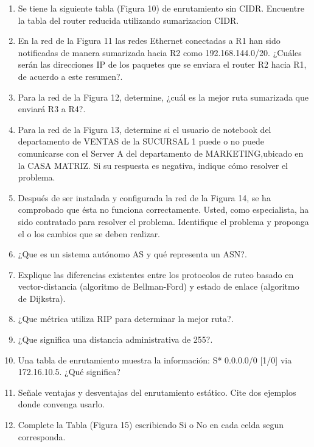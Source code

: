 \documentclass{udparticle}
\begin{document}
\begin{enumerate}
\item Se tiene la siguiente tabla (Figura 10) de enrutamiento sin CIDR. Encuentre 
la tabla del router reducida utilizando sumarizacion CIDR.
\item En la red de la Figura 11 las redes Ethernet conectadas a R1 han sido 
notificadas de manera sumarizada hacia R2 como 192.168.144.0/20. ¿Cuáles serán 
las direcciones IP de los paquetes que se enviara el router R2 hacia R1, de acuerdo a este resumen?.
\item Para la red de la Figura 12, determine, ¿cuál es la mejor ruta sumarizada que
enviará R3 a R4?. 

\item Para la red de la Figura 13, determine si el usuario de notebook del 
departamento de VENTAS de la SUCURSAL 1 puede o no puede comunicarse con el Server 
A del departamento de MARKETING,ubicado en la CASA MATRIZ. Si su respuesta es 
negativa, indique cómo resolver el problema.

\item Después de ser instalada y configurada la red de la Figura 14, se ha 
comprobado que ésta no funciona correctamente. Usted, como especialista, ha sido 
contratado para resolver el problema. Identifique el problema y proponga el o los 
cambios que se deben realizar.

\item ¿Que es un sistema autónomo AS y qué representa un ASN?.
\item Explique las diferencias existentes entre los protocolos de ruteo basado en
vector-distancia (algoritmo de Bellman-Ford) y estado de enlace (algoritmo de Dijkstra).

\item ¿Que métrica utiliza RIP para determinar la mejor ruta?.
\item ¿Que significa una distancia administrativa de 255?.
\item Una tabla de enrutamiento muestra la información: S* 0.0.0.0/0 [1/0] via 172.16.10.5. ¿Qué significa?
\item Señale ventajas y desventajas del enrutamiento estático. Cite dos ejemplos donde convenga usarlo.
\item Complete la Tabla (Figura 15) escribiendo Si o No en cada celda segun corresponda.


\end{enumerate}
\end{document}
